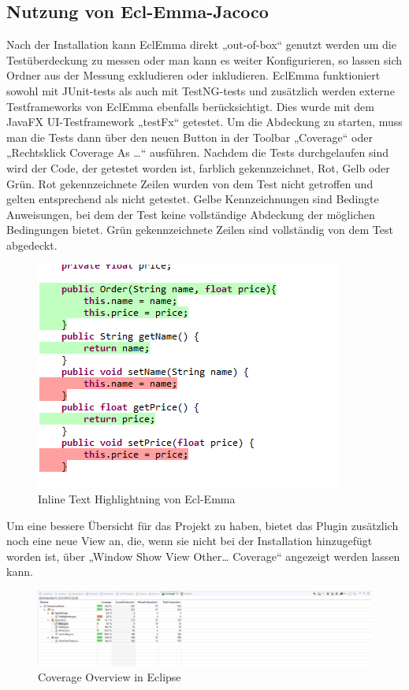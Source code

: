 \documentclass[a4paper]{article}
\begin{document}
\subsection{Nutzung von Ecl-Emma-Jacoco}
Nach der Installation kann EclEmma direkt „out-of-box“ genutzt werden um die Testüberdeckung zu messen oder man kann es weiter Konfigurieren, so lassen sich Ordner aus der Messung exkludieren oder inkludieren. EclEmma funktioniert sowohl mit JUnit-tests als auch mit TestNG-tests und zusätzlich werden externe Testframeworks von EclEmma ebenfalls berücksichtigt. Dies wurde mit dem JavaFX UI-Testframework „testFx“ getestet. 
\bigbreak
Um die Abdeckung zu starten, muss man die Tests dann über den neuen Button in der Toolbar „Coverage“ oder „Rechtsklick \textrightarrow{} Coverage As …“ ausführen. Nachdem die Tests durchgelaufen sind wird der Code, der getestet worden ist, farblich gekennzeichnet, Rot, Gelb oder Grün. Rot gekennzeichnete Zeilen wurden von dem Test nicht getroffen und gelten entsprechend als nicht getestet. Gelbe Kennzeichnungen sind Bedingte Anweisungen, bei dem der Test keine vollständige Abdeckung der möglichen Bedingungen bietet. Grün gekennzeichnete Zeilen sind vollständig von dem Test abgedeckt.
\begin{figure}[h]
\includegraphics[scale=1.0]{Highlightning.png}
\caption{Inline Text Highlightning von Ecl-Emma}
\centering
\end{figure}
\bigbreak
Um eine bessere Übersicht für das Projekt zu haben, bietet das Plugin zusätzlich noch eine neue View an, die, wenn sie nicht bei der Installation hinzugefügt worden ist, über „Window \textrightarrow{} Show View \textrightarrow{} Other… \textrightarrow{} Coverage“ angezeigt werden lassen kann. 
\begin{figure}[h]
\includegraphics[scale=0.40]{Coverage_View.png}
\caption{Coverage Overview in Eclipse}
\centering
\end{figure}
\end{document}
